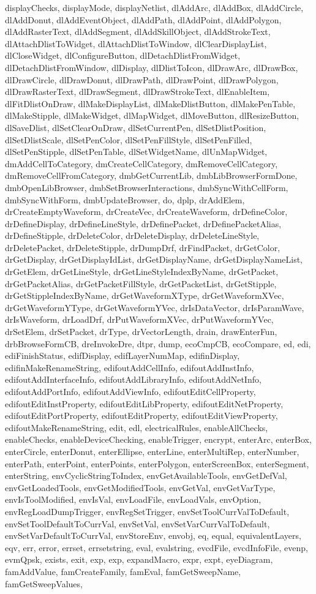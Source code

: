 {{displayChecks, displayMode, displayNetlist, dlAddArc, dlAddBox, dlAddCircle, dlAddDonut, dlAddEventObject, dlAddPath, dlAddPoint, dlAddPolygon, dlAddRasterText, dlAddSegment, dlAddSkillObject, dlAddStrokeText, dlAttachDlistToWidget, dlAttachDlistToWindow, dlClearDisplayList, dlCloseWidget, dlConfigureButton, dlDetachDlistFromWidget, dlDetachDlistFromWindow, dlDisplay, dlDlistToIcon, dlDrawArc, dlDrawBox, dlDrawCircle, dlDrawDonut, dlDrawPath, dlDrawPoint, dlDrawPolygon, dlDrawRasterText, dlDrawSegment, dlDrawStrokeText, dlEnableItem, dlFitDlistOnDraw, dlMakeDisplayList, dlMakeDlistButton, dlMakePenTable, dlMakeStipple, dlMakeWidget, dlMapWidget, dlMoveButton, dlResizeButton, dlSaveDlist, dlSetClearOnDraw, dlSetCurrentPen, dlSetDlistPosition, dlSetDlistScale, dlSetPenColor, dlSetPenFillStyle, dlSetPenFilled, dlSetPenStipple, dlSetPenTable, dlSetWidgetName, dlUnMapWidget, dmAddCellToCategory, dmCreateCellCategory, dmRemoveCellCategory, dmRemoveCellFromCategory, dmbGetCurrentLib, dmbLibBrowserFormDone, dmbOpenLibBrowser, dmbSetBrowserInteractions, dmbSyncWithCellForm, dmbSyncWithForm, dmbUpdateBrowser, do, dplp, drAddElem, drCreateEmptyWaveform, drCreateVec, drCreateWaveform, drDefineColor, drDefineDisplay, drDefineLineStyle, drDefinePacket, drDefinePacketAlias, drDefineStipple, drDeleteColor, drDeleteDisplay, drDeleteLineStyle, drDeletePacket, drDeleteStipple, drDumpDrf, drFindPacket, drGetColor, drGetDisplay, drGetDisplayIdList, drGetDisplayName, drGetDisplayNameList, drGetElem, drGetLineStyle, drGetLineStyleIndexByName, drGetPacket, drGetPacketAlias, drGetPacketFillStyle, drGetPacketList, drGetStipple, drGetStippleIndexByName, drGetWaveformXType, drGetWaveformXVec, drGetWaveformYType, drGetWaveformYVec, drIsDataVector, drIsParamWave, drIsWaveform, drLoadDrf, drPutWaveformXVec, drPutWaveformYVec, drSetElem, drSetPacket, drType, drVectorLength, drain, drawEnterFun, drbBrowseFormCB, dreInvokeDre, dtpr, dump, ecoCmpCB, ecoCompare, ed, edi, ediFinishStatus, edifDisplay, edifLayerNumMap, edifinDisplay, edifinMakeRenameString, edifoutAddCellInfo, edifoutAddInstInfo, edifoutAddInterfaceInfo, edifoutAddLibraryInfo, edifoutAddNetInfo, edifoutAddPortInfo, edifoutAddViewInfo, edifoutEditCellProperty, edifoutEditInstProperty, edifoutEditLibProperty, edifoutEditNetProperty, edifoutEditPortProperty, edifoutEditProperty, edifoutEditViewProperty, edifoutMakeRenameString, edit, edl, electricalRules, enableAllChecks, enableChecks, enableDeviceChecking, enableTrigger, encrypt, enterArc, enterBox, enterCircle, enterDonut, enterEllipse, enterLine, enterMultiRep, enterNumber, enterPath, enterPoint, enterPoints, enterPolygon, enterScreenBox, enterSegment, enterString, envCyclicStringToIndex, envGetAvailableTools, envGetDefVal, envGetLoadedTools, envGetModifiedTools, envGetVal, envGetVarType, envIsToolModified, envIsVal, envLoadFile, envLoadVals, envOption, envRegLoadDumpTrigger, envRegSetTrigger, envSetToolCurrValToDefault, envSetToolDefaultToCurrVal, envSetVal, envSetVarCurrValToDefault, envSetVarDefaultToCurrVal, envStoreEnv, envobj, eq, equal, equivalentLayers, eqv, err, error, errset, errsetstring, eval, evalstring, evcdFile, evcdInfoFile, evenp, evmQpsk, exists, exit, exp, exp, expandMacro, expr, expt, eyeDiagram, famAddValue, famCreateFamily, famEval, famGetSweepName, famGetSweepValues, }}
